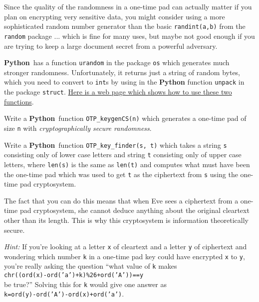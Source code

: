 \documentclass[12pt,letterpaper]{amsbook}
\theoremstyle{definition}
\theoremstyle{remark}
\numberwithin{figure}{section}
\numberwithin{exercise}{chapter}
\numberwithin{section}{chapter}
\numberwithin{equation}{section}
\numberwithin{table}{subsection}
\newcommand{\code}[1]{\colorbox{lg}{\texttt{#1}}}
\newcommand{\Python}{{\textbf{\ix{Python}}}}
\newcommand{\bhref}[2]{\href{#1}{#2}}
\newcommand{\ix}[1]{{#1}\index{#1}}
\begin{document}
\vskip2mm
\begin{BTtcb}[label=bt:OTPkeygen_better_rand]{}{}
 Since the quality of the randomness in a one-time pad can actually matter if
 you plan on encrypting very sensitive data, you might consider using a more
 sophisticated random number generator than the basic \code{randint(a,b)}
 from the \code{random} package ... which is fine for many uses, but maybe
 not good enough if you are trying to keep a large document secret from a
 powerful adversary.

 \Python\ has a function \code{urandom} in the package \code{os}
 which generates much stronger randomness.  Unfortunately, it returns just a
 string of random bytes, which you need to convert to \code{int}s by
 using in the {\Python} function \code{unpack} in the package
 \code{struct}.  \bhref{https://pynative.com/cryptographically-secure-random-data-in-python/}{Here is a web page which shows how to use these
 two functions}.

 Write a \Python\ function \code{OTP\_keygenCS(n)} which generates a
 one-time pad of size \code{n} with
 \textit{cryptographically secure randomness}.
\end{BTtcb}

\vskip2mm
\begin{CTtcb}[label=ct:OTPkeyfinder]{}{}
 Write a \Python\ function \code{OTP\_key\_finder(s, t)} which takes
 a string \code{s} consisting only of lower case letters and string
 \code{t} consisting only of upper case letters, where \code{len(s)}
 is the same as \code{len(t)} and computes what must have been the
 one-time pad which was used to get \code{t} as the ciphertext from
 \code{s} using the one-time pad cryptosystem.

 The fact that you can do this means that when Eve sees a ciphertext from
 a one-time pad cryptosystem, she cannot deduce anything about the original
 cleartext other than its length.  This is why this cryptosystem is information
 theoretically secure.

 \textit{Hint:} If you're looking at a letter \code{x} of cleartext and
 a letter \code{y} of ciphertext and wondering which number \code{k}
 in a one-time pad key could have encrypted \code{x} to \code{y},
 you're really asking the question ``what value of \code{k} makes\\
 \hphantom{XXX}\code{chr((ord(x)-ord('a')+k)\%26+ord('A'))==y}\\
 be true?''  Solving this
 for \code{k} would give one answer as\\
 \hphantom{XXX}\code{k=ord(y)-ord('A')-ord(x)+ord('a')}.
\end{CTtcb}
\end{document}
